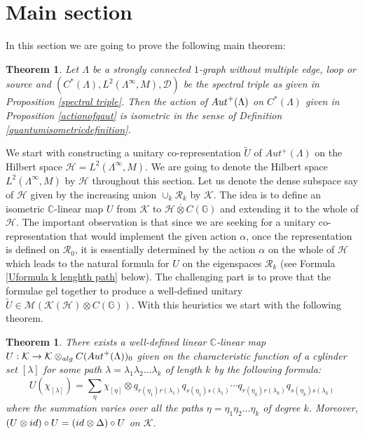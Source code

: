 \documentclass{amsart}
\theoremstyle{plain}
\newtheorem{theorem}[subsection]{Theorem}
\theoremstyle{definition}
\theoremstyle{remark}
\numberwithin{equation}{section}
\newcommand{\cal}{\mathcal}
\newcommand{\cld}{{\cal D}}
\newcommand{\clh}{{\cal H}}
\newcommand{\clk}{{\cal K}}
\newcommand{\clm}{{\cal M}}
\newcommand{\clr}{{\cal R}}
\newcommand{\raro}{\rightarrow}
\begin{document}
\section{Main section}
In this section we are going to prove the following main theorem:
\begin{theorem}
    \label{maintheorem}
    Let $\Lambda$ be a strongly connected $1$-graph without multiple edge, loop or source and $(C^{\ast}(\Lambda),L^{2}(\Lambda^{\infty},M),\cld)$ be the spectral triple as given in Proposition \ref{spectral triple}. Then the action of ${\rm Aut}^{+}(\Lambda)$ on $C^{\ast}(\Lambda)$ given in Proposition \ref{actionofqaut} is isometric in the sense of Definition \ref{quantumisometricdefinition}.
\end{theorem}We start with constructing a unitary co-representation $\widetilde{U}$ of $Aut^{+}(\Lambda)$ on the Hilbert space $\clh=L^{2}(\Lambda^{\infty},M)$. We are going to denote the Hilbert space $L^{2}(\Lambda^{\infty},M)$ by $\clh$ throughout this section. Let us denote the dense subspace say of $\clh$ given by the increasing union $\cup_{k}\clr_{k}$ by $\clk$. The idea is to define an isometric $\mathbb{C}$-linear map $U$ from $\clk$ to $\clh\overline{\otimes}C(\mathbb{G})$ and extending it to the whole of $\clh$. The important observation is that since we are seeking for a unitary co-representation that would implement the given action $\alpha$, once the representation is defined on $\clr_{0}$, it is essentially determined by the action $\alpha$ on the whole of $\clh$ which leads to the natural formula for $U$ on the eigenspaces $\clr_{k}$ (see Formula \ref{Uformula k lenghth path} below). The challenging part is to prove that the formulae gel together to produce a well-defined unitary $\widetilde{U}\in\clm(\clk(\clh)\otimes C(\mathbb{G}))$. With this heuristics we start with the following theorem.    
\begin{theorem}
\label{U-map}
     There exists a well-defined linear $\mathbb{C}$-linear map $U:\mathcal{K}\raro \mathcal{K}\otimes_{{\rm alg}} C(\rm{Aut}^{+}(\Lambda))_{0}$ given on the characteristic function of a cylinder set $[\lambda]$ for some path $\lambda=\lambda_{1}\lambda_{2}\ldots\lambda_{k}$ of length $k$ by the following formula:
     \begin{equation}
\label{Uformula k lenghth path}
    U(\chi_{[\lambda]})=\sum_{\eta}\chi_{[\eta]}\otimes q_{r(\eta_{1})r(\lambda_{1})}q_{s(\eta_{1})s(\lambda_{1})}\cdots q_{r(\eta_{k})r(\lambda_{k})}q_{s(\eta_{k})s(\lambda_{k})}
\end{equation}
where the summation varies over all the paths $\eta=\eta_{1}\eta_{2}\ldots\eta_{k}$ of degree $k$. Moreover, $(U\otimes{\rm id})\circ U=({\rm id}\otimes\Delta)\circ U$ on $\clk$.
\end{theorem}
\end{document}
